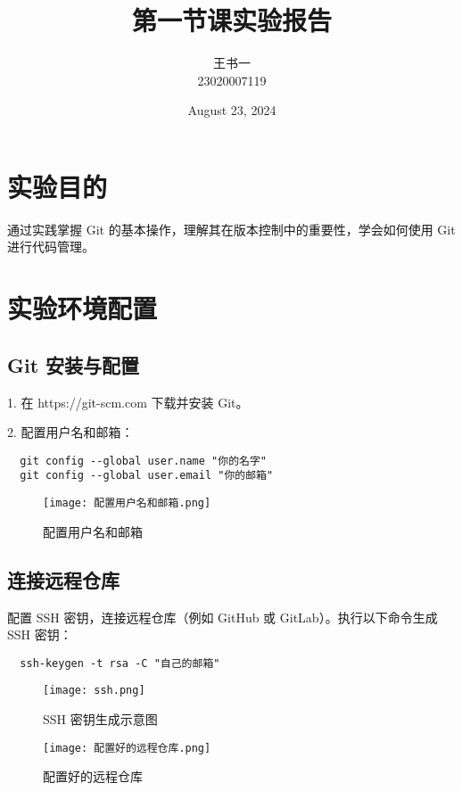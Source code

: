 \documentclass[a4paper, 12pt]{article}
\begin{document}
  \title{第一节课实验报告}
  \author{王书一 \\ 23020007119}
  \date{August 23, 2024}
  \maketitle

 \tableofcontents
 \newpage

  
  \section{实验目的}
   通过实践掌握 Git 的基本操作，理解其在版本控制中的重要性，学会如何使用 Git 进行代码管理。
  \section{实验环境配置}
  \subsection{Git 安装与配置}
  1. 在 https://git-scm.com 下载并安装 Git。
  
  2. 配置用户名和邮箱：
  \begin{verbatim}
  git config --global user.name "你的名字"
  git config --global user.email "你的邮箱"
  \end{verbatim}
  
  \begin{figure}[h]
  \centering
    \texttt{[image: 配置用户名和邮箱.png]}
  \caption{配置用户名和邮箱}
   \end{figure}

  \subsection{连接远程仓库}
  配置 SSH 密钥，连接远程仓库（例如 GitHub 或 GitLab）。执行以下命令生成 SSH 密钥：
  \begin{verbatim}
  ssh-keygen -t rsa -C "自己的邮箱" 
  \end{verbatim}

\begin{figure}[H]
  \centering
    \texttt{[image: ssh.png]}
  \caption{SSH 密钥生成示意图}
   \label{fig:ssh-keygen} 
   \end{figure}

\begin{figure}[H]
  \centering
 \texttt{[image: 配置好的远程仓库.png]}
  \caption{配置好的远程仓库}
   \end{figure}
\end{document}
